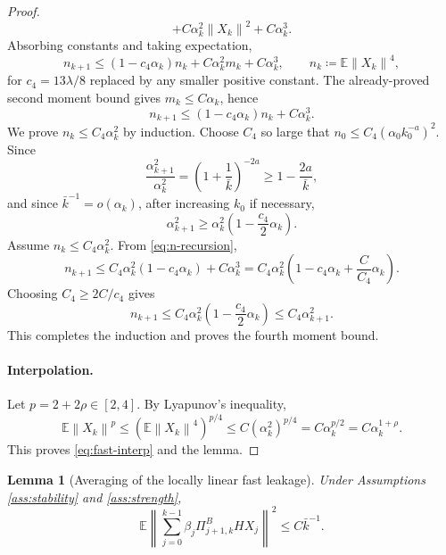 \documentclass{article}
\newtheorem{lemma}[theorem]{Lemma}
\newcommand{\E}{\mathbb{E}}
\newcommand{\norm}[1]{\left\lVert #1\right\rVert}
\begin{document}
\begin{proof}
\[       +C\alpha_k^2\norm{X_k}^2+C\alpha_k^3.
\]
Absorbing constants and taking expectation,
\begin{equation}
  n_{k+1}\le(1-c_4\alpha_k)n_k+C\alpha_k^2m_k+C\alpha_k^3,
  \qquad n_k\coloneqq\E\norm{X_k}^4, \label{eq:n-recursion-pre}
\end{equation}
for $c_4=13\lambda/8$ replaced by any smaller positive constant. The already-proved second moment bound gives $m_k\le C\alpha_k$, hence
\begin{equation}
  n_{k+1}\le(1-c_4\alpha_k)n_k+C\alpha_k^3. \label{eq:n-recursion}
\end{equation}
We prove $n_k\le C_4\alpha_k^2$ by induction. Choose $C_4$ so large that $n_0\le C_4(\alpha_0 k_0^{-a})^2$. Since
\[
  \frac{\alpha_{k+1}^2}{\alpha_k^2}=\left(1+\frac1{\bar k}\right)^{-2a}
  \ge1-\frac{2a}{\bar k},
\]
and since $\bar k^{-1}=o(\alpha_k)$, after increasing $k_0$ if necessary,
\begin{equation}
  \alpha_{k+1}^2\ge \alpha_k^2\left(1-\frac{c_4}{2}\alpha_k\right). \label{eq:alpha2-compare}
\end{equation}
Assume $n_k\le C_4\alpha_k^2$. From \eqref{eq:n-recursion},
\[
  n_{k+1}\le C_4\alpha_k^2(1-c_4\alpha_k)+C\alpha_k^3
  =C_4\alpha_k^2\left(1-c_4\alpha_k+\frac{C}{C_4}\alpha_k\right).
\]
Choosing $C_4\ge 2C/c_4$ gives
\[
  n_{k+1}\le C_4\alpha_k^2\left(1-\frac{c_4}{2}\alpha_k\right)
  \le C_4\alpha_{k+1}^2.
\]
This completes the induction and proves the fourth moment bound.

\paragraph{Interpolation.}
Let $p=2+2\rho\in[2,4]$. By Lyapunov's inequality,
\[
  \E\norm{X_k}^p\le \left(\E\norm{X_k}^4\right)^{p/4}
  \le C\left(\alpha_k^2\right)^{p/4}
  =C\alpha_k^{p/2}
  =C\alpha_k^{1+\rho}.
\]
This proves \eqref{eq:fast-interp} and the lemma.
\end{proof}

\begin{lemma}[Averaging of the locally linear fast leakage]\label{lem:linear-leakage}
Under Assumptions \ref{ass:stability} and \ref{ass:strength},
\begin{equation}
  \E\left\|\sum_{j=0}^{k-1}\beta_j\Pi^B_{j+1,k}HX_j\right\|^2
  \le C\bar k^{-1}. \label{eq:linear-leakage-bound}
\end{equation}
\end{lemma}
\end{document}
